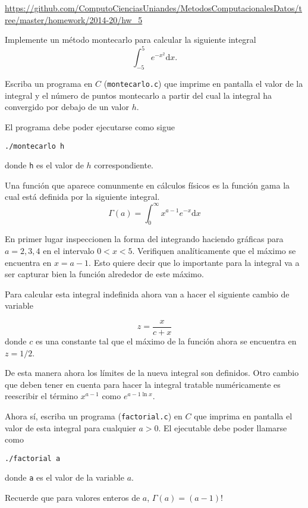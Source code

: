 \documentclass[11pt,letterpaper]{exam}
\begin{document}
\noindent
\url{https://github.com/ComputoCienciasUniandes/MetodosComputacionalesDatos/tree/master/homework/2014-20/hw_5} 
\begin{questions}




Implemente un m\'etodo montecarlo para calcular la siguiente integral
\begin{displaymath}
\int_{-5}^5 e^{-x^2}\mathrm{d}x.
\end{displaymath}

Escriba un programa en $C$ (\verb"montecarlo.c") que imprime en
pantalla el valor de la integral y el n\'umero de puntos montecarlo a
partir del cual la integral ha convergido por debajo de un valor $h$. 

El programa debe poder ejecutarse como sigue

\begin{verbatim}
./montecarlo h
\end{verbatim}
donde \verb"h" es el valor de $h$ correspondiente.




Una funci\'on que aparece comunmente en c\'alculos f\'isicos es la
funci\'on gama la cual est\'a definida por la siguiente integral.
\begin{equation}
\Gamma(a) = \int_{0}^{\infty} x^{a-1}e^{-x}\mathrm{d}x
\end{equation}

En primer lugar inspeccionen la forma del integrando haciendo
gr\'aficas para $a=2,3,4$ en el intervalo $0<x<5$. Verifiquen
anal\'iticamente que el m\'aximo se encuentra en $x=a-1$. Esto quiere
decir que lo importante para la integral va a ser capturar bien la
funci\'on alrededor de este m\'aximo.

Para calcular esta integral indefinida ahora van a hacer el siguiente
cambio de variable

\begin{equation}
z = \frac{x}{c+x}
\end{equation}
donde $c$ es una constante tal que el m\'aximo de la funci\'on ahora
se encuentra en $z=1/2$.

De esta manera ahora los l\'imites de la nueva integral son definidos.
Otro cambio que deben tener en cuenta para hacer la integral tratable
num\'ericamente es reescribir el t\'ermino $x^{a-1}$ como $e^{{a-1}\ln
  x}$.

Ahora s\'i, escriba un programa (\verb"factorial.c") en $C$ que
imprima en pantalla el valor de esta integral para cualquier $a>0$. El
ejecutable debe poder llamarse como 
\begin{verbatim}
./factorial a
\end{verbatim}
donde \verb"a" es el valor de la variable $a$. 

Recuerde que para valores enteros de $a$, $\Gamma(a)=(a-1)!$


\end{questions}
\end{document}
